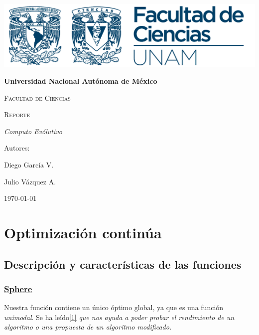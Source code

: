 \documentclass{article}
\begin{document}
\begin{titlepage}
{\includegraphics[width=1\textwidth]{./img/logoFC.png}\par}
\vspace{1cm}
\centering
{\bfseries\huge Universidad Nacional Autónoma de México \par}
\vspace{1cm}
{\scshape\huge Facultad de Ciencias \par}
\vspace{2cm}
{\scshape\Huge Reporte \par}
\vspace{2cm}
{\itshape\LARGE Computo Evólutivo \par}
\vfill
{\large Autores: \par}
{\large Diego García V. \par}
{\large Julio Vázquez A. \par}
\vfill
{\Large \today \par}
\end{titlepage}

\section*{Optimización continúa}

\subsection*{Descripción y características de las funciones}

\subsubsection*{\href{https://www.sfu.ca/~ssurjano/spheref.html}{Sphere}}
Nuestra función contiene un único óptimo global, ya que es una función \textit{unimodal}.
Se ha leído\href{https://xloptimizer.com/projects/toy-problems/sphere-function-pure-excel#:~:text=The\%20sphere\%20function\%20is\%20one,proposed\%20modification\%20of\%20an\%20algorithm.)}{[1]} \textit{que nos ayuda a poder probar el rendimiento de un algoritmo o una propuesta de un algoritmo
modificado.}
\end{document}
